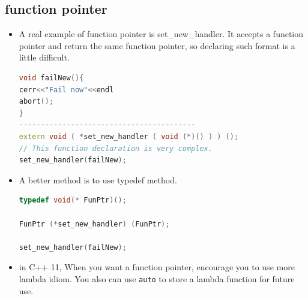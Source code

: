\documentclass[a4paper,12pt,twoside]{book}
\begin{document}
\subsection{function pointer}
\begin{itemize}  

\item A real example of function pointer is set\_new\_handler. It accepts a function pointer and return the same function pointer, so declaring such format is a little difficult.
\begin{lstlisting}[frame=single, language=c++]
void failNew(){
cerr<<"Fail now"<<endl
abort();
}
-----------------------------------------
extern void ( *set_new_handler ( void (*)() ) ) ();
// This function declaration is very complex.
set_new_handler(failNew);
\end{lstlisting}

\item A better method is to use typedef method.

\begin{lstlisting}[frame=single, language=c++]
typedef void(* FunPtr)();

FunPtr (*set_new_handler) (FunPtr);

set_new_handler(failNew);
\end{lstlisting}

\item in C++ 11, When you want a function pointer, encourage you to use more lambda idiom. You also can use \texttt{auto} to store a lambda function for future use.
\end{itemize}
\end{document}

